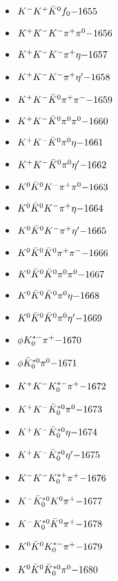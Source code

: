\begin{multicols}{3}
\begin{itemize}
 \item $ K^{-} K^{+} \bar{K}^{0} f_{0} \hfill{-1655}$
 \item $ K^{+} K^{-} K^{-} \pi^{+} \pi^{0} \hfill{-1656}$
 \item $ K^{+} K^{-} K^{-} \pi^{+} \eta \hfill{-1657}$
 \item $ K^{+} K^{-} K^{-} \pi^{+} {\eta^{\prime}} \hfill{-1658}$
 \item $ K^{+} K^{-} \bar{K}^{0} \pi^{+} \pi^{-} \hfill{-1659}$
 \item $ K^{+} K^{-} \bar{K}^{0} \pi^{0} \pi^{0} \hfill{-1660}$
 \item $ K^{+} K^{-} \bar{K}^{0} \pi^{0} \eta \hfill{-1661}$
 \item $ K^{+} K^{-} \bar{K}^{0} \pi^{0} {\eta^{\prime}} \hfill{-1662}$
 \item $ K^{0} \bar{K}^{0} K^{-} \pi^{+} \pi^{0} \hfill{-1663}$
 \item $ K^{0} \bar{K}^{0} K^{-} \pi^{+} \eta \hfill{-1664}$
 \item $ K^{0} \bar{K}^{0} K^{-} \pi^{+} {\eta^{\prime}} \hfill{-1665}$
 \item $ K^{0} \bar{K}^{0} \bar{K}^{0} \pi^{+} \pi^{-} \hfill{-1666}$
 \item $ K^{0} \bar{K}^{0} \bar{K}^{0} \pi^{0} \pi^{0} \hfill{-1667}$
 \item $ K^{0} \bar{K}^{0} \bar{K}^{0} \pi^{0} \eta \hfill{-1668}$
 \item $ K^{0} \bar{K}^{0} \bar{K}^{0} \pi^{0} {\eta^{\prime}} \hfill{-1669}$
 \item $ \phi K_{0}^{*-} \pi^{+} \hfill{-1670}$
 \item $ \phi \bar{K}_{0}^{*0} \pi^{0} \hfill{-1671}$
 \item $ K^{+} K^{-} K_{0}^{*-} \pi^{+} \hfill{-1672}$
 \item $ K^{+} K^{-} \bar{K}_{0}^{*0} \pi^{0} \hfill{-1673}$
 \item $ K^{+} K^{-} \bar{K}_{0}^{*0} \eta \hfill{-1674}$
 \item $ K^{+} K^{-} \bar{K}_{0}^{*0} {\eta^{\prime}} \hfill{-1675}$
 \item $ K^{-} K^{-} K_{0}^{*+} \pi^{+} \hfill{-1676}$
 \item $ K^{-} \bar{K}_{0}^{*0} K^{0} \pi^{+} \hfill{-1677}$
 \item $ K^{-} K_{0}^{*0} \bar{K}^{0} \pi^{+} \hfill{-1678}$
 \item $ K^{0} \bar{K}^{0} K_{0}^{*-} \pi^{+} \hfill{-1679}$
 \item $ K^{0} \bar{K}^{0} \bar{K}_{0}^{*0} \pi^{0} \hfill{-1680}$

\end{itemize}
\end{multicols}
